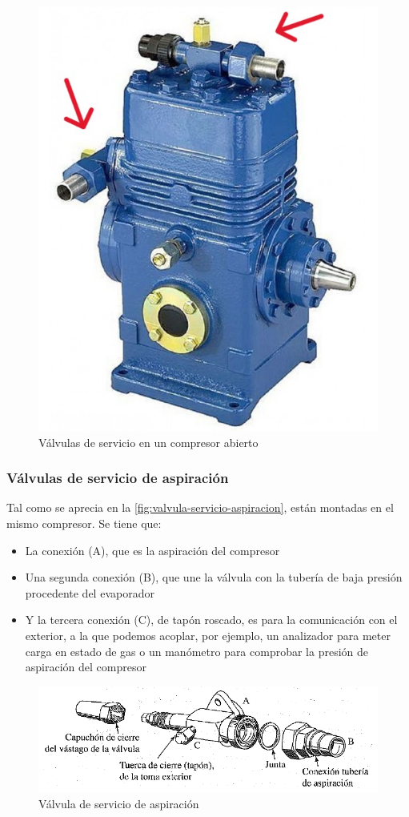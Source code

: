 \begin{figure}[H]
    \centering
    \includegraphics[width=.6\linewidth]{figuras/control-seguridad/valvulas-servicio.jpg}
    \caption{V\'alvulas de servicio en un compresor abierto}
    \label{fig:valvulas-servicio-compresor}
\end{figure}

\subsubsection{V\'alvulas de servicio de aspiraci\'on}

Tal como se aprecia en la \autoref{fig:valvula-servicio-aspiracion}, est\'an montadas en el mismo compresor. Se tiene que:

\begin{itemize}
    \item La conexi\'on (A), que es la aspiraci\'on del compresor
    \item Una segunda conexi\'on (B), que une la v\'alvula con la tuber\'ia de baja presi\'on procedente del evaporador
    \item Y la tercera conexi\'on (C), de tap\'on roscado, es para la comunicaci\'on con el exterior, a la que podemos acoplar, por ejemplo, un analizador para meter carga en estado de gas o un man\'ometro para comprobar la presi\'on de aspiraci\'on del compresor
\end{itemize}

\begin{figure}[H]
    \centering
    \includegraphics[width=.6\linewidth]{figuras/control-seguridad/valvula-servicio-aspiracion.png}
    \caption{V\'alvula de servicio de aspiraci\'on}
    \label{fig:valvula-servicio-aspiracion}
\end{figure}

